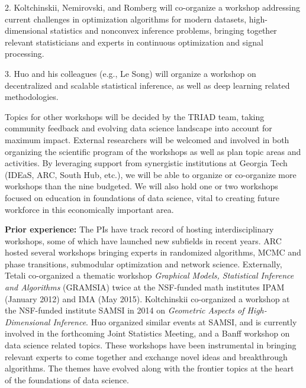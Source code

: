 \documentclass[12pt]{article}
\begin{document}
2.  Koltchinskii, Nemirovski, and Romberg will co-organize a workshop addressing current challenges in optimization algorithms for modern datasets,  high-dimensional statistics and nonconvex inference problems, bringing together relevant statisticians and experts in continuous optimization and signal processing.

3. Huo and his colleagues (e.g., Le Song) will organize a workshop on decentralized and scalable statistical inference, as well as deep learning related methodologies.

\medskip

Topics for other workshops will be decided by the TRIAD team, taking community feedback and
evolving data science landscape into account for maximum impact. External researchers will be welcomed and involved in both organizing the scientific program of the workshops as well as
plan topic areas and activities. By leveraging support from synergistic institutions at Georgia Tech (IDEaS, ARC, South Hub, etc.), we will be able to organize or co-organize more workshops than the nine budgeted. We will also hold one or two workshops focused on
education in foundations of data science, vital to creating future workforce in this economically important area.

\noindent
{\bf Prior experience:}
The PIs have track record of hosting interdisciplinary workshops, some of which have launched new subfields in recent years. ARC hosted several workshops bringing experts in
randomized algorithms, MCMC and phase transitions, submodular optimization and network
science. Externally, Tetali co-organized a thematic workshop  {\em Graphical Models, Statistical Inference and Algorithms} (GRAMSIA) twice at the NSF-funded math institutes
IPAM (January 2012) and IMA (May 2015). Koltchinskii co-organized a workshop at the
NSF-funded institute SAMSI in 2014 on {\em Geometric Aspects of High-Dimensional Inference}.
Huo organized similar events at SAMSI, and is currently involved in the forthcoming
Joint Statistics Meeting, and a Banff workshop on data science related topics.
These workshops have been instrumental in bringing relevant experts  to come together and exchange novel ideas and breakthrough algorithms. The themes have evolved along with the frontier topics at the heart of the foundations of data science.

\clearpage

\normalbaselineskip
{}



%

\end{document}
